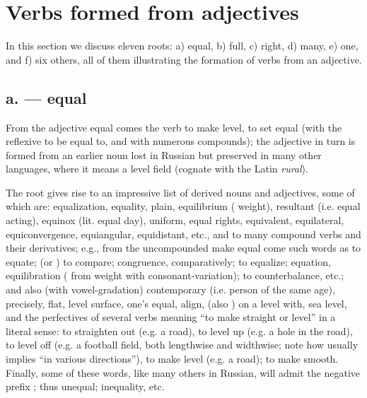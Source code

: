 \section{Verbs formed from adjectives}

In this section we discuss eleven roots: a)  equal, b)  full, c)  right, d)  many, e)  one, and f) six others, all of them illustrating the formation of verbs from an adjective.

\subsection*{a.  --- equal}

From the adjective  equal comes the verb  to make level, to set equal (with the reflexive  to be equal to, and with numerous compounds); the adjective  in turn is formed from an earlier noun  lost in Russian but preserved in many other languages, where it means a level field (cognate with the Latin \emph{rural}).

The root  gives rise to an impressive list of derived nouns and adjectives, some of which are:  equalization,  equality,  plain,  equilibrium ( weight),  resultant (i.e. equal acting),  equinox (lit. equal day),  uniform,  equal rights,  equivalent,  equilateral,  equiconvergence,  equiangular,  equidistant, etc., and to many compound verbs and their derivatives; e.g., from the uncompounded  make equal come such words as  to equate;  (or ) to compare;  congruence,  comparatively;  to equalize;  equation,  equilibration ( from  weight with consonant-variation);  to counterbalance, etc.; and also (with vowel-gradation)  contemporary (i.e. person of the same age),  precisely,  flat,  level surface,  one's equal,  align,  (also ) on a level with,  sea level, and the perfectives of several verbs meaning ``to make straight or level'' in a literal sense:  to straighten out (e.g. a road),  to level up (e.g. a hole in the road),  to level off (e.g. a football field, both lengthwise and widthwise; note how  usually implies ``in various directions''),  to make level (e.g. a road);  to make smooth. Finally, some of these words, like many others in Russian, will admit the negative prefix ; thus  unequal;  inequality, etc.

